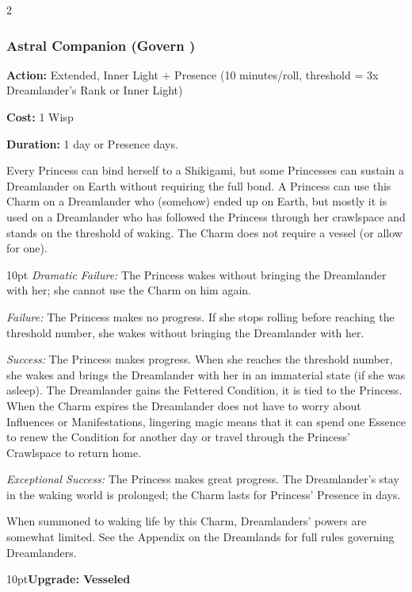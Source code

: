 \begin{multicols}{2}
\subsubsection*{Astral Companion (Govern \textbullet\textbullet\textbullet)}

\noindent \textbf{Action:} Extended, Inner Light + Presence (10 minutes/roll, threshold = 3x Dreamlander's Rank or Inner Light)

\noindent \textbf{Cost:} 1 Wisp

\noindent \textbf{Duration:} 1 day or Presence days.

Every Princess can bind herself to a Shikigami, but some Princesses can sustain a Dreamlander on Earth without requiring the full bond. A Princess can use this Charm on a Dreamlander who (somehow) ended up on Earth, but mostly it is used on a Dreamlander who has followed the Princess through her crawlspace and stands on the threshold of waking. The Charm does not require a vessel (or allow for one).

\begin{myindentpar}{10pt}    \emph{Dramatic Failure:} The Princess wakes without bringing the Dreamlander with her; she cannot use the Charm on him again.

    \emph{Failure:} The Princess makes no progress. If she stops rolling before reaching the threshold number, she wakes without bringing the Dreamlander with her.

    \emph{Success:} The Princess makes progress. When she reaches the threshold number, she wakes and brings the Dreamlander with her in an immaterial state (if she was asleep). The Dreamlander gains the Fettered Condition, it is tied to the Princess. When the Charm expires the Dreamlander does not have to worry about Influences or Manifestations, lingering magic means that it can spend one Essence to renew the Condition for another day or travel through the Princess' Crawlspace to return home. 

    \emph{Exceptional Success:} The Princess makes great progress. The Dreamlander's stay in the waking world is prolonged; the Charm lasts for Princess' Presence in days.\end{myindentpar}

When summoned to waking life by this Charm, Dreamlanders' powers are somewhat limited. See the Appendix on the Dreamlands for full rules governing Dreamlanders. 

\begin{myindentpar}{10pt}\textbf{Upgrade: Vesseled}


\end{myindentpar}
\end{multicols}

